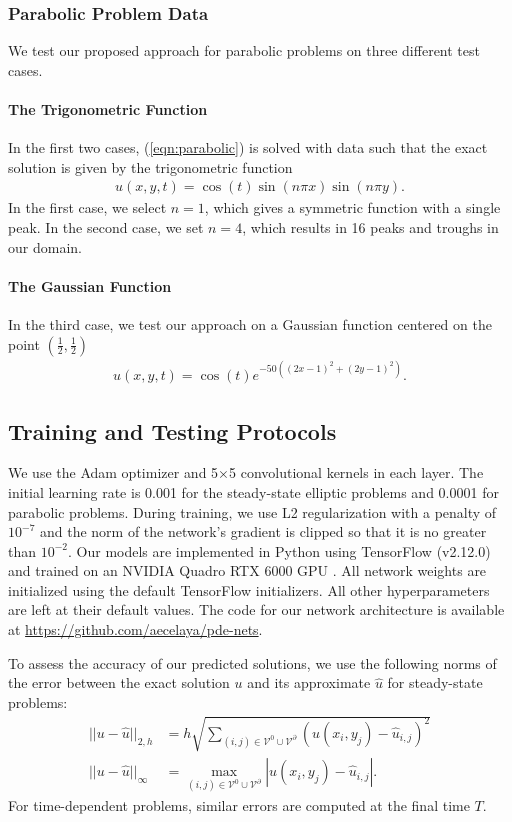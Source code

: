 \documentclass[preprint,12pt]{elsarticle}
\begin{document}
\subsubsection{Parabolic Problem Data} \label{sec:data-parabolic}
We test our proposed approach for parabolic problems on three different test cases.
\paragraph{The Trigonometric Function} In the first two cases, (\ref{eqn:parabolic}) is solved with data such that the exact solution is given by the trigonometric function
\begin{align}
    u(x, y, t) = \cos(t)\sin(n \pi x)\sin(n \pi y).
\end{align}
In the first case, we select $n=1$, which gives a symmetric function with a single peak. In the second case, we set $n=4$, which results in 16 peaks and troughs in our domain. 

\paragraph{The Gaussian Function} In the third case, we test our approach on a  Gaussian function centered on the point $\left(\frac{1}{2}, \frac{1}{2}\right)$
\begin{align}
    u(x, y, t) = \cos(t)e^{-50\left((2x - 1)^2 + (2y - 1)^2\right)}.
\end{align}

\subsection{Training and Testing Protocols}
 We use the Adam optimizer \cite{adam} and 5$\times$5 convolutional kernels in each layer. The initial learning rate is 0.001 for the steady-state elliptic problems and 0.0001 for parabolic problems. During training, we use L2 regularization with a penalty of $10^{-7}$ and the norm of the network's gradient is clipped so that it is no greater than $10^{-2}$. Our models are implemented in Python using TensorFlow (v2.12.0) and trained on an NVIDIA Quadro RTX 6000 GPU \cite{keras}. All network weights are initialized using the default TensorFlow initializers. All other hyperparameters are left at their default values. The code for our network architecture is available at \url{https://github.com/aecelaya/pde-nets}.

To assess the accuracy of our predicted solutions, we use the following norms of the error between the exact solution $u$ and its approximate $\hat{u}$ for steady-state problems:
\begin{align}
    ||u - \hat{u}||_{2,h} &= h \sqrt{\sum_{(i,j)\in\mathcal{V}^0\cup\mathcal{V}^\partial} (u(x_i,y_j) - \hat{u}_{i,j})^2} \\
    ||u - \hat{u}||_{\infty} &= \max_{(i,j)\in\mathcal{V}^0\cup\mathcal{V}^\partial} |u(x_i,y_j) - \hat{u}_{i,j}|.
\end{align}
For time-dependent problems, similar errors are computed at the final time $T$.
\end{document}
